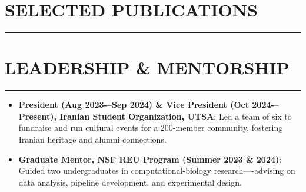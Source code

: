 \documentclass[9pt,letterpaper]{extarticle}
\newcommand{\sectionsep}{%
  \par
  \vspace{-2ex}%
  \noindent\rule{\textwidth}{1pt}%
  \vspace{-0.5ex}%
  \par
}
\begin{document}


\section*{SELECTED PUBLICATIONS}\sectionsep
\begin{itemize}
 

\end{itemize}


\section*{LEADERSHIP \& MENTORSHIP}
\sectionsep
\begin{itemize}
  \item \textbf{President (Aug 2023-–Sep 2024) \& Vice President (Oct 2024-–Present), 
  Iranian Student Organization, UTSA}: Led a team of six to fundraise and run cultural events for a 200-member community, fostering Iranian heritage and alumni connections.
  \item \textbf{Graduate Mentor, NSF REU Program (Summer 2023 \& 2024)}: Guided two 
  undergraduates in computational-biology research—-advising on data analysis, pipeline development, and experimental design.
\end{itemize}
\end{document}
